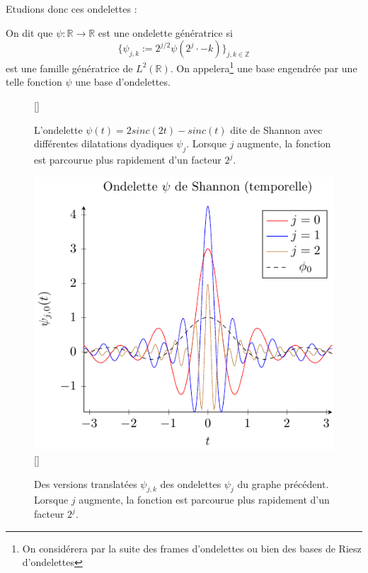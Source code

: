 Etudions donc ces ondelettes :
\begin{definition}
	On dit que $\psi:\mathbb{R} \to \mathbb{R}$ est une ondelette génératrice si 
	\begin{equation}
		\{\psi_{j,k} := 2^{j/2}\psi(2^j\cdot - k)\}_{j,k \in \mathbb{Z}}
	\end{equation}
	est une famille génératrice de $L^2(\mathbb{R})$.
	On appelera\footnote{On considérera par la suite des frames d'ondelettes ou bien des bases de Riesz d'ondelettes} une base engendrée par une telle fonction $\psi$ une base d'ondelettes.
\end{definition}
\begin{figure}
	[\FBwidth]
	{\caption{L'ondelette $\psi(t)=2sinc(2t)-sinc(t)$ dite de Shannon avec différentes dilatations dyadiques $\psi_j$. Lorsque $j$ augmente, la fonction est parcourue plus rapidement d'un facteur $2^j$.}\label{fig:shannon}}
	{\includegraphics{Figs/shannon}}
	[\FBwidth]
		{\caption{Des versions translatées $\psi_{j,k}$ des ondelettes $\psi_j$ du graphe précédent. Lorsque $j$ augmente, la fonction est parcourue plus rapidement d'un facteur $2^j$.}}

\end{figure}
